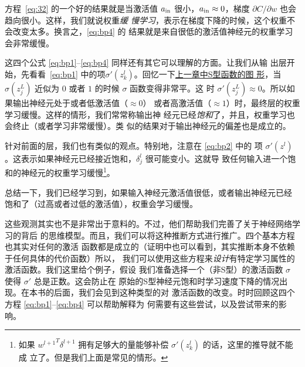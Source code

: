 方程~\eqref{eq:32} 的一个好的结果就是当激活值 $a_{\rm in}$ 很小，$a_{\rm in}
\approx 0$，梯度 $\partial C/\partial w$ 也会趋向很小。这样，我们就说权重\emph{缓
  慢学习}，表示在梯度下降的时候，这个权重不会改变太多。换言之，\eqref{eq:bp4} 的
结果就是来自很低的激活值神经元的权重学习会非常缓慢。

这四个公式 \eqref{eq:bp1}--\eqref{eq:bp4} 同样还有其它可以理解的方面。让我们从输
出层开始，先看看~\eqref{eq:bp1}
中的项$\sigma'(z_k^l)$。回忆一下\hyperref[fig:sigmoid_graph]{上一章中S型函数的图
  形}，当 $\sigma(z^L_j)$ 近似为 $0$ 或者 $1$ 的时候 $\sigma$ 函数变得非常平。这
时 $\sigma'(z^L_j) \approx 0$。所以如果输出神经元处于或者低激活值（$\approx 0$）
或者高激活值（$\approx 1$）时，最终层的权重学习缓慢。这样的情形，我们常常称输出神
经元已经\emph{饱和}了，并且，权重学习也会终止（或者学习非常缓慢）。类
似的结果对于输出神经元的偏差也是成立的。

针对前面的层，我们也有类似的观点。特别地，注意在 \eqref{eq:bp2} 中的
项 $\sigma'(z^l)$。这表示如果神经元已经接近饱和，$\delta_j^l$ 很可能变小。这就导
致任何输入进一个饱和的神经元的权重学习缓慢\footnote{如果 ${w^{l+1}}^T
  \delta^{l+1}$ 拥有足够大的量能够补偿 $\sigma'(z_k^l)$ 的话，这里的推导就不能成
  立了。但是我们上面是常见的情形。}。

总结一下，我们已经学习到，如果输入神经元激活值很低，或者输出神经元已经
饱和了（过高或者过低的激活值），权重会学习缓慢。

这些观测其实也不是非常出于意料的。不过，他们帮助我们完善了关于神经网络学习的背后
的思维模型。而且，我们可以将这种推断方式进行推广。四个基本方程也其实对任何的激活
函数都是成立的（证明中也可以看到，其实推断本身不依赖于任何具体的代价函数）所以，
我们可以使用这些方程来\emph{设计}有特定学习属性的激活函数。我们这里给个例子，假设
我们准备选择一个（非S型）的激活函数 $\sigma$ 使得 $\sigma'$ 总是正数。这会防止在
原始的S型神经元饱和时学习速度下降的情况出现。在本书的后面，我们会见到这种类型的对
激活函数的改变。时时回顾这四个方程 \eqref{eq:bp1}--\eqref{eq:bp4} 可以帮助解释为
何需要有这些尝试，以及尝试带来的影响。

